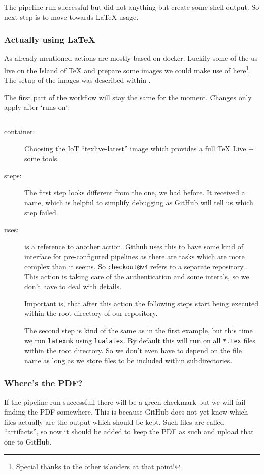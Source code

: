 \documentclass[final]{ltugboat}
\newcommand*{\action}[1]{\texttt{#1}}
\newcommand*{\command}[1]{\texttt{#1}}
\newcommand*{\file}[1]{\texttt{#1}}
\newcommand*{\containerimage}[1]{\enquote{#1}}
\begin{document}
The pipeline run successful but did not anything but create some shell output.
So next step is to move towards \LaTeX{} usage.

\subsubsection{Actually using \LaTeX}

As already mentioned actions are mostly based on docker.
Luckily some of the us live on the Island of TeX and prepare some images we could make use of here\footnote{Special thanks to the other islanders at that point!}.
The setup of the images was described within \cite{islandoftex-docker-gitlab}.

The first part of the workflow will stay the same for the moment.
Changes only apply after `runs-on`:

\inputminted[firstline=5, lastline=12,gobble=3]{yaml}{examples/latex-basic.yml}


\begin{description}
\item[container:] Choosing the IoT \containerimage{texlive-latest} image which provides a full TeX Live + some tools\cite{islandoftex-docker}.
\item[steps:]
The first step looks different from the one, we had before.
It received a name, which is helpful to simplify debugging as GitHub will tell us which step failed.

\item[uses:] is a reference to another action.
Github uses this to have some kind of interface for pre-configured pipelines as there are tasks which are more complex than it seems.
So \action{checkout@v4} refers to a separate repository \cite{github-action-checkout}.
This action is taking care of the authentication and some interals, so we don't have to deal with details.

Important is, that after this action the following steps start being executed within the root directory of our repository.

The second step is kind of the same as in the first example, but this time we run \command{latexmk}\cite{latexmk} using \command{lualatex}.
By default this will run on all \file{*.tex} files within the root directory.
So we don't even have to depend on the file name as long as we store files to be included within subdirectories.
\end{description}

\subsubsection{Where's the PDF?}
If the pipeline run successfull there will be a green checkmark but we will fail finding the PDF somewhere.
This is because GitHub does not yet know which files actually are the output which should be kept.
Such files are called \enquote{artifacts}, so now it should be added to keep the PDF as such and upload that one to GitHub.
\end{document}
